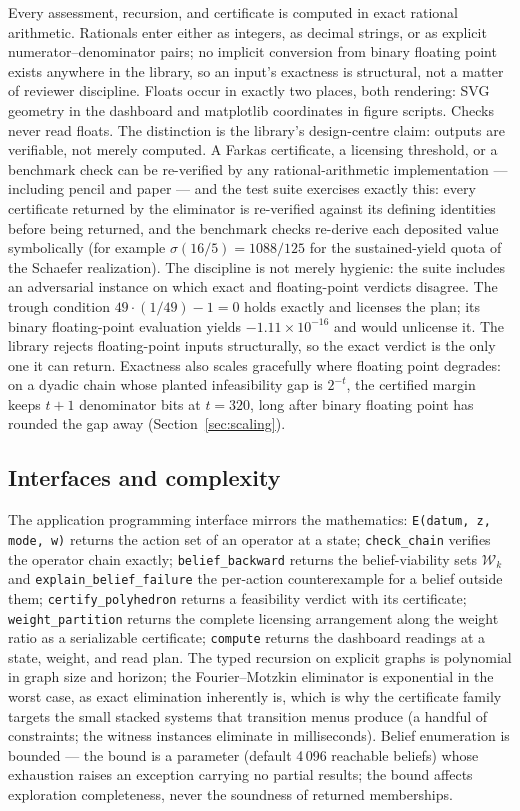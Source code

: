 \documentclass[3p,11pt]{elsarticle}
\begin{document}
Every assessment, recursion, and certificate is computed in exact rational
arithmetic. Rationals enter either as integers, as decimal strings, or as
explicit numerator--denominator pairs; no implicit conversion from binary
floating point exists anywhere in the library, so an input's exactness is
structural, not a matter of reviewer discipline. Floats occur in exactly two
places, both rendering: SVG geometry in the dashboard and matplotlib
coordinates in figure scripts. Checks never read floats. The distinction is
the library's design-centre claim: outputs are verifiable, not merely
computed. A Farkas certificate, a licensing threshold, or a benchmark check
can be re-verified by any rational-arithmetic implementation --- including
pencil and paper --- and the test suite exercises exactly this: every
certificate returned by the eliminator is re-verified against its defining
identities before being returned, and the benchmark checks re-derive each
deposited value symbolically (for example $\sigma(16/5) = 1088/125$ for the
sustained-yield quota of the Schaefer realization). The discipline is not
merely hygienic: the suite includes an adversarial instance on which exact
and floating-point verdicts disagree. The trough condition
$49 \cdot (1/49) - 1 = 0$ holds exactly and licenses the plan; its binary
floating-point evaluation yields $-1.11 \times 10^{-16}$ and would
unlicense it. The library rejects floating-point inputs structurally, so
the exact verdict is the only one it can return. Exactness also scales
gracefully where floating point degrades: on a dyadic chain whose planted
infeasibility gap is $2^{-t}$, the certified margin keeps $t + 1$
denominator bits at $t = 320$, long after binary floating point has
rounded the gap away (Section~\ref{sec:scaling}).

\subsection{Interfaces and complexity}\label{sec:api}

The application programming interface mirrors the mathematics:
\texttt{E(datum, z, mode, w)} returns the action set of an operator at a
state; \texttt{check\_chain} verifies the operator chain exactly;
\texttt{belief\_backward} returns the belief-viability sets
$\mathcal{W}_k$ and \texttt{explain\_belief\_failure} the per-action
counterexample for a belief outside them; \texttt{certify\_polyhedron}
returns a feasibility verdict with its certificate;
\texttt{weight\_partition} returns the complete licensing arrangement along
the weight ratio as a serializable certificate;
\texttt{compute} returns the dashboard readings at a
state, weight, and read plan. The typed recursion on explicit graphs is
polynomial in graph size and horizon; the Fourier--Motzkin eliminator is
exponential in the worst case, as exact elimination inherently is, which is
why the certificate family targets the small stacked systems that transition
menus produce (a handful of constraints; the witness instances eliminate in
milliseconds). Belief enumeration is bounded --- the bound is a parameter
(default 4\,096 reachable beliefs) whose exhaustion raises an exception
carrying no partial results; the bound affects exploration completeness,
never the soundness of returned memberships.
\end{document}
